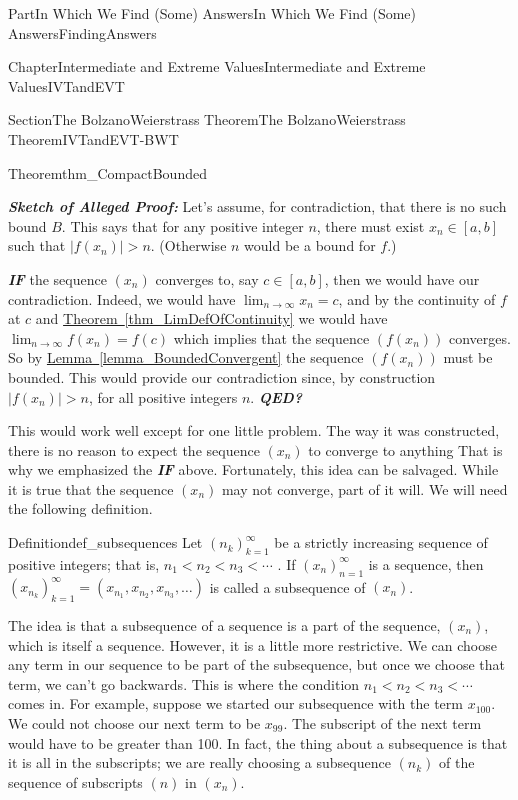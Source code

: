 \documentclass[oneside,10pt,]{book}
\newcommand{\xreffont}{\relax}
\newcommand{\alert}[1]{\textbf{\textit{#1}}}
\numberwithin{equation}{part}
\newcommand{\abs}[1]{\left|#1\right|}
\def\limit#1#2#3{{\displaystyle\lim_{#1\rightarrow #2}#3}}
\newcommand{\lt}{<}
\newcommand{\gt}{>}
\begin{document}
\begin{partptx}{Part}{In Which We Find (Some) Answers}{}{In Which We Find (Some) Answers}{}{}{FindingAnswers}
\begin{chapterptx}{Chapter}{Intermediate and Extreme Values}{}{Intermediate and Extreme Values}{}{}{IVTandEVT}
\begin{sectionptx}{Section}{The Bolzano\textendash{}Weierstrass Theorem}{}{The Bolzano\textendash{}Weierstrass Theorem}{}{}{IVTandEVT-BWT}
\begin{theorem}{Theorem}{}{}{thm_CompactBounded}
\end{theorem}
\alert{Sketch of Alleged Proof:} Let's assume, for contradiction, that there is no such bound \(B\). This says that for any positive integer \(n\), there must exist \(x_n\in[a,b]\) such that \(\abs{f(x_n)}>n\). (Otherwise \(n\) would be a bound for \(f\).)%
\par
\alert{IF} the sequence \(\left(x_n\right)\) converges to, say \(c\in[a,b]\), then we would have our contradiction. Indeed, we would have \(\limit{n}{\infty}{x_n}=c\), and by the continuity of \(f\) at \(c\) and \hyperref[thm_LimDefOfContinuity]{Theorem~{\xreffont\ref{thm_LimDefOfContinuity}}} we would have \(\limit{n}{\infty}{f(x_n)}=f(c)\) which implies that the sequence \(\left(f(x_n)\right)\) converges. So by \hyperref[lemma_BoundedConvergent]{Lemma~{\xreffont\ref{lemma_BoundedConvergent}}} the sequence \(\left(f(x_n)\right)\) must be bounded.  This would provide our contradiction since, by construction \(\abs{f(x_n)}\gt{}n\), for all positive integers \(n\). \alert{QED?}%
\par
This would work well except for one little problem. The way it was constructed, there is no reason to expect the sequence \(\left(x_n\right)\) to converge to anything That is why we emphasized the \alert{IF} above. Fortunately, this idea can be salvaged. While it is true that the sequence \(\left(x_n\right)\) may not converge, part of it will. We will need the following definition.%
\begin{definition}{Definition}{}{def_subsequences}%
%
%
%
Let \(\left(n_k\right)_{k=1}^\infty\) be a strictly increasing sequence of positive integers; that is, \(n_1\lt n_2\lt n_3\lt \cdots\) . If \(\left(x_n\right)_{n=1}^\infty\) is a sequence, then \(\left(x_{n_k}\right)_{k=1}^\infty=\left(x_{n_1},x_{n_2},x_{n_3},\ldots \right)\) is called a subsequence of \(\left(x_n\right)\).%
\end{definition}
The idea is that a subsequence of a sequence is a part of the sequence, \((x_n)\), which is itself a sequence. However, it is a little more restrictive. We can choose any term in our sequence to be part of the subsequence, but once we choose that term, we can't go backwards. This is where the condition \(n_1\lt n_2\lt n_3\lt \cdots\) comes in. For example, suppose we started our subsequence with the term \(x_{100}\). We could not choose our next term to be \(x_{99}\). The subscript of the next term would have to be greater than 100. In fact, the thing about a subsequence is that it is all in the subscripts; we are really choosing a subsequence \(\left(n_k\right)\) of the sequence of subscripts \(\left(n\right)\) in \(\left(x_n\right)\).%

\end{sectionptx}
\end{chapterptx}
\end{partptx}
\end{document}
